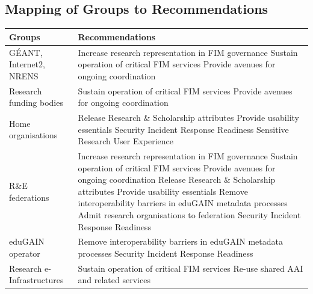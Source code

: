 \documentclass[fleqn,11pt]{wlscirep}
\begin{document}
{\subsection{Mapping of Groups to Recommendations}

\begin{center}
\begin{longtable}{|p{}|p{}|} 
\hline
Groups & Recommendations \\ \hline \hline
GÉANT, Internet2, NRENS &  
Increase research representation in FIM governance \newline
Sustain operation of critical FIM services\newline
Provide avenues for ongoing coordination \\ \hline

Research funding bodies & 
Sustain operation of critical FIM services\newline
Provide avenues for ongoing coordination \\ \hline

Home organisations & 
Release Research \& Scholarship attributes\newline
Provide usability essentials\newline
Security Incident Response Readiness\newline
Sensitive Research User Experience \\ \hline

R\&E federations & 
Increase research representation in FIM governance\newline
Sustain operation of critical FIM services\newline
Provide avenues for ongoing coordination\newline
Release Research \& Scholarship attributes\newline
Provide usability essentials\newline
Remove interoperability barriers in eduGAIN metadata processes\newline
Admit research organisations to federation\newline
Security Incident Response Readiness \\ \hline

eduGAIN operator & 
Remove interoperability barriers in eduGAIN metadata processes\newline
Security Incident Response Readiness\\ \hline

Research e-Infrastructures& 
Sustain operation of critical FIM services\newline
Re-use shared AAI and related services \\ \hline


\end{longtable}
\end{center}}
\end{document}
